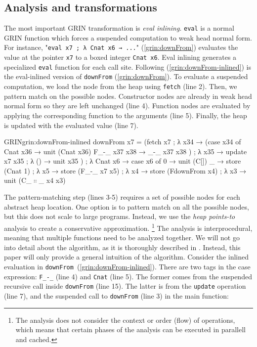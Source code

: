 \documentclass[9pt, twocolumn]{article}
\newcommand{\refp}[1]{(\ref{#1})}
\begin{document}
\subsection{Analysis and transformations}
\label{sec:analysis-and-transformations}
The most important GRIN transformation is \emph{eval inlining}. 
\lstinline{eval} is a normal GRIN function which forces a suspended computation to weak head normal form.
For instance, "\lstinline{eval x7 ; λ Cnat x6 → ...}" \refp{grin:downFrom} evaluates the value at the pointer \lstinline{x7} to a boxed integer \lstinline{Cnat x6}.
Eval inlining generates a specialized \lstinline{eval} function for each call site.
Following \refp{grin:downFrom-inlined} is the \mbox{eval-inlined} version of \lstinline{downFrom} \refp{grin:downFrom}.
To evaluate a suspended computation, we load the node from the heap using \lstinline{fetch} (line 2). 
Then, we pattern match on the possible nodes. 
Constructor nodes are already in weak head normal form so they are left unchanged (line 4).
Function nodes are evaluated by applying the corresponding function to the arguments (line 5).
Finally, the heap is updated with the evaluated value (line 7).

\begin{typewriter}[left]{GRIN}{grin:downFrom-inlined}
downFrom x7 =
  (fetch x7 ; λ x34 →
   (case x34 of
      Cnat x36 → unit (Cnat x36)
      F_-_ x37 x38 → _-_ x37 x38
   ) ; λ x35 →
   update x7 x35 ; λ () →
   unit x35
  ) ; λ Cnat x6 →
  case x6 of
    0 → unit (C[])
    _ →
      store (Cnat 1) ; λ x5 →
      store (F_-_ x7 x5) ; λ x4 →
      store (FdownFrom x4) ; λ x3 →
      unit (C_$∷$_ x4 x3)
\end{typewriter}

The pattern-matching step (lines 3-5) requires a set of possible nodes for each abstract heap location.
One option is to pattern match on all the possible nodes, but this does not scale to large programs.
Instead, we use the \emph{heap points-to} analysis \citep{johnsson1991} to create a conservative approximation.%
\footnote{%
The analysis does not consider the context or order (flow) of operations, which means that certain phases of the analysis can be executed in parallell and cached. 

}
The analysis is interprocedural, meaning that multiple functions need to be analyzed together.
We will not go into detail about the algorithm, as it is thoroughly described in \citep{boquist1996, johnsson1991}. 
Instead, this paper will only provide a general intuition of the algorithm.
Consider the inlined evaluation in \mbox{\lstinline{downFrom} \refp{grin:downFrom-inlined}}.
There are two tags in the case expression: \lstinline{F_-_} (line 4) and \lstinline{Cnat} (line 5). 
The former comes from the suspended recursive call inside \lstinline{downFrom} (line 15). 
The latter is from the \lstinline{update} operation (line 7), and the suspended call to \lstinline{downFrom} (line 3) in the main function:
\end{document}
